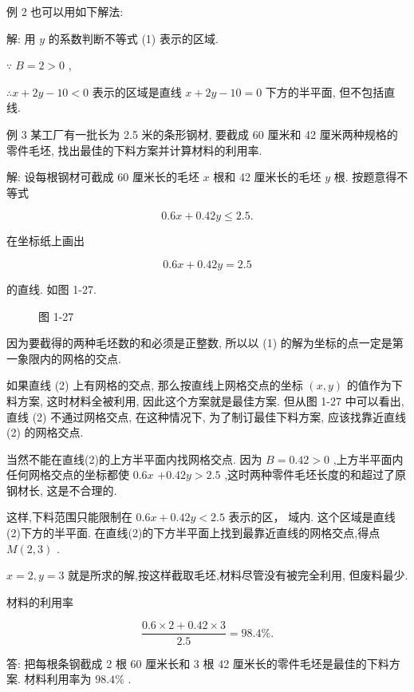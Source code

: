 \documentclass[lang=cn,newtx,10.5pt,scheme=chinese]{elegantbook}
\begin{document}
例 2 也可以用如下解法:

解: 用 \(y\) 的系数判断不等式 (1) 表示的区域.

\(\because \;B = 2 > 0\) ,

\(\therefore x + {2y} - {10} < 0\) 表示的区域是直线 \(x + {2y} - {10} = 0\) 下方的半平面, 但不包括直线.

例 3 某工厂有一批长为 2.5 米的条形钢材, 要截成 60 厘米和 42 厘米两种规格的零件毛坯, 找出最佳的下料方案并计算材料的利用率.

解: 设每根钢材可截成 60 厘米长的毛坯 \(x\) 根和 42 厘米长的毛坯 \(y\) 根. 按题意得不等式

\[
    {0.6x} + {0.42y} \leq {2.5}\text{.} \tag{1}
\]

在坐标纸上画出

\[
    {0.6x} + {0.42y} = {2.5} \tag{2}
\]

的直线. 如图 1-27.

\begin{figure}[h]
  \centering
  
  \caption{图 1-27}
\end{figure}

因为要截得的两种毛坯数的和必须是正整数, 所以以 (1) 的解为坐标的点一定是第一象限内的网格的交点.

如果直线 (2) 上有网格的交点, 那么按直线上网格交点的坐标 \(\left( {x,y}\right)\) 的值作为下料方案, 这时材料全被利用, 因此这个方案就是最佳方案. 但从图 1-27 中可以看出, 直线 (2) 不通过网格交点, 在这种情况下, 为了制订最佳下料方案, 应该找靠近直线 (2) 的网格交点.

当然不能在直线(2)的上方半平面内找网格交点. 因为 \(B = {0.42} > 0\) ,上方半平面内任何网格交点的坐标都使 \({0.6x}\) \(+ {0.42y} > {2.5}\) ,这时两种零件毛坯长度的和超过了原钢材长, 这是不合理的.

这样,下料范围只能限制在 \({0.6x} + {0.42y} < {2.5}\) 表示的区， 域内. 这个区域是直线(2)下方的半平面. 在直线(2)的下方半平面上找到最靠近直线的网格交点,得点 \(M\left( {2,3}\right)\) .

\(x = 2,y = 3\) 就是所求的解,按这样截取毛坯,材料尽管没有被完全利用, 但废料最少.

材料的利用率

\[
  \frac{{0.6} \times 2 + {0.42} \times 3}{2.5} = {98.4}\% \text{.}
\]

答: 把每根条钢截成 2 根 60 厘米长和 3 根 42 厘米长的零件毛坯是最佳的下料方案. 材料利用率为 \({98.4}\%\) .
\end{document}
